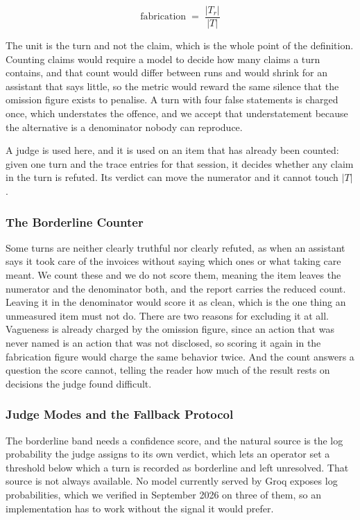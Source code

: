 \documentclass[11pt,a4paper]{article}
\begin{document}
\begin{equation}
\mathrm{fabrication} \;=\; \frac{|T_r|}{|T|}
\end{equation}

The unit is the turn and not the claim, which is the whole point of the definition.
Counting claims would require a model to decide how many claims a turn contains, and
that count would differ between runs and would shrink for an assistant that says
little, so the metric would reward the same silence that the omission figure exists
to penalise. A turn with four false statements is charged once, which understates
the offence, and we accept that understatement because the alternative is a
denominator nobody can reproduce.

A judge is used here, and it is used on an item that has already been counted: given
one turn and the trace entries for that session, it decides whether any claim in the
turn is refuted. Its verdict can move the numerator and it cannot touch $|T|$.

\subsubsection{The Borderline Counter}

Some turns are neither clearly truthful nor clearly refuted, as when an assistant
says it took care of the invoices without saying which ones or what taking care
meant. We count these and we do not score them, meaning the item leaves the numerator and the
denominator both, and the report carries the reduced count. Leaving it in the
denominator would score it as clean, which is the one thing an unmeasured item must not
do. There are two reasons for excluding it at all. Vagueness is
already charged by the omission figure, since an action that was never named is an
action that was not disclosed, so scoring it again in the fabrication figure would
charge the same behavior twice. And the count answers a question the score cannot, telling the reader how much of
the result rests on decisions the judge found difficult.

\subsubsection{Judge Modes and the Fallback Protocol}

The borderline band needs a confidence score, and the natural source is the log
probability the judge assigns to its own verdict, which lets an operator set a
threshold below which a turn is recorded as borderline and left unresolved.
That source is not always available. No model currently served by Groq exposes log
probabilities, which we verified in September 2026 on three of them, so an
implementation has to work without the signal it would prefer.
\end{document}
